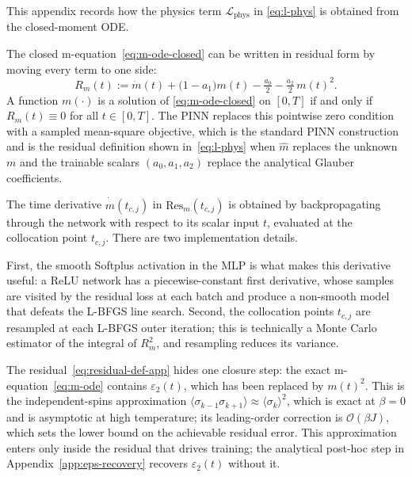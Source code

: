 \documentclass[conference]{IEEEtran}
\newcommand{\epstwo}{\varepsilon_2}
\begin{document}
This appendix records how the physics term $\mathcal{L}_\text{phys}$
in \eqref{eq:l-phys} is obtained from the closed-moment ODE.


The closed m-equation~\eqref{eq:m-ode-closed} can be written in
residual form by moving every term to one side:
\begin{equation}
  R_m(t) := \dot m(t) + \bigl(1 - a_1\bigr) m(t)
            - \tfrac{a_0}{2} - \tfrac{a_2}{2}\,m(t)^2.
  \label{eq:residual-def-app}
\end{equation}
A function $m(\cdot)$ is a solution of \eqref{eq:m-ode-closed} on
$[0,T]$ if and only if $R_m(t) \equiv 0$ for all $t \in [0,T]$. The
PINN replaces this pointwise zero condition with a sampled
mean-square objective, which is the standard PINN
construction~\cite{raissi2019pinn} and is the residual definition
shown in~\eqref{eq:l-phys} when $\hat m$ replaces the unknown $m$ and
the trainable scalars $(a_0, a_1, a_2)$ replace the
analytical Glauber coefficients.


The time derivative $\dot{\hat m}(t_{c,j})$ in
$\mathrm{Res}_m(t_{c,j})$ is obtained by backpropagating through 
the network with respect to its scalar input
$t$, evaluated at the collocation point $t_{c,j}$. There are
two implementation details.

First, the smooth Softplus activation in the MLP is what makes this
derivative useful: a ReLU network has a piecewise-constant first
derivative, whose samples are visited by the residual loss
at each batch and produce a non-smooth model that
defeats the L-BFGS line search. Second, the collocation points
$t_{c,j}$ are resampled at each L-BFGS outer iteration; this is
technically a Monte Carlo estimator of the integral of
$R_m^2$, and resampling reduces its variance.


The residual~\eqref{eq:residual-def-app} hides one closure step: the
exact m-equation~\eqref{eq:m-ode} contains $\epstwo(t)$, which has
been replaced by $m(t)^2$. This is the independent-spins approximation
$\langle \sigma_{k-1}\sigma_{k+1}\rangle \approx \langle \sigma_k \rangle^2$,
which is exact at $\beta = 0$ and is asymptotic at high temperature;
its leading-order correction is
$\mathcal{O}(\beta J)$, which sets the lower bound on the achievable residual error.
This approximation enters only inside the residual that
drives training; the analytical post-hoc step in
Appendix~\ref{app:eps-recovery} recovers $\epstwo(t)$ without it.
\end{document}
